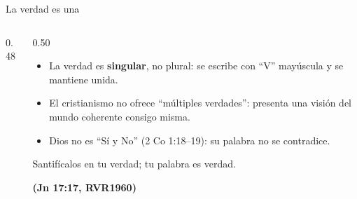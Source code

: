 \documentclass[hyperref={bookmarks=false},aspectratio=169]{beamer}
\newcommand{\fuente}[1]{\par\hfill{\upshape\bfseries\footnotesize\textcolor{azul}{#1}}}
\newcommand{\destacar}[1]{\textbf{\textcolor{azul}{#1}}}
\begin{document}
\begin{frame}{La verdad es una}
\begin{columns}[c,onlytextwidth]
\begin{column}{0.48\textwidth}
\centering
{}
\end{column}
\begin{column}{0.50\textwidth}\small
\begin{itemize}
\item La verdad es \destacar{singular}, no plural: se escribe con ``V'' mayúscula y se mantiene unida.
\item El cristianismo no ofrece ``múltiples verdades'': presenta una visión del mundo coherente consigo misma.
\item Dios no es ``Sí y No'' (2 Co 1:18--19): su palabra no se contradice.
\end{itemize}
\begin{cita}Santifícalos en tu verdad; tu palabra es verdad.\fuente{(Jn 17:17, RVR1960)}\end{cita}
\end{column}
\end{columns}
\end{frame}
\end{document}
